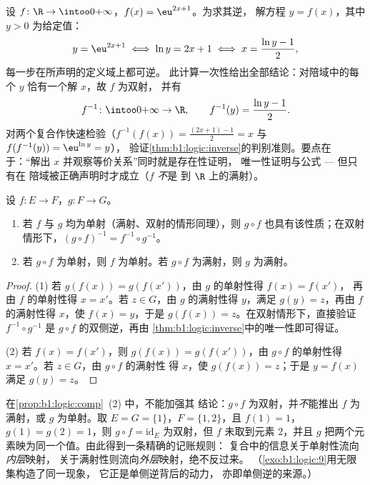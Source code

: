 \begin{example}[实际计算逆映射]\label{ex:b1:logic:inversecomp}
设 $f \colon \R \to \intoo0{+\infty}$，$f(x) = \eu^{2x+1}$。为求其逆，
解方程 $y = f(x)$，其中 $y > 0$ 为给定值：
\[
y = \eu^{2x+1} \iff \ln y = 2x + 1 \iff x = \frac{\ln y - 1}2 ,
\]
每一步在所声明的定义域上都可逆。
此计算一次性给出全部结论：对陪域中的每个 $y$
恰有一个解 $x$，故 $f$ 为双射，
并有
\[
f^{-1} \colon \intoo0{+\infty} \to \R,
\qquad
f^{-1}(y) = \frac{\ln y - 1}2 .
\]
对两个复合作快速检验（$f^{-1}(f(x)) = \frac{(2x+1) -
1}2 = x$ 与 $f(f^{-1}(y)) = \eu^{\ln y} = y$），
验证\cref{thm:b1:logic:inverse}的判别准则。要点在于：“解出
$x$ 并观察等价关系”同时就是存在性证明，
唯一性证明与公式 --- 但只有在
陪域被正确声明时才成立（$f$ \emph{不}是
到 $\R$ 上的满射）。
\end{example}

\begin{proposition}[复合与三种性质]\label{prop:b1:logic:comp}
设 $f \colon E \to F$，$g \colon F \to G$。
\begin{enumerate}
  \item 若 $f$ 与 $g$ 均为单射（满射、双射的情形同理），则
        $g \circ f$ 也具有该性质；在双射情形下，$(g \circ f)^{-1} = f^{-1} \circ
        g^{-1}$。
  \item 若 $g \circ f$ 为单射，则 $f$ 为单射。若
        $g \circ f$ 为满射，则 $g$ 为满射。
\end{enumerate}
\end{proposition}

\begin{proof}
(1) 若 $g(f(x)) = g(f(x'))$，由 $g$ 的单射性得 $f(x) = f(x')$，
再由 $f$ 的单射性得 $x = x'$。若 $z \in G$，由
$g$ 的满射性得 $y$，满足 $g(y) = z$，再由 $f$ 的满射性得 $x$，使
$f(x) = y$，于是 $g(f(x)) = z$。在双射情形下，直接验证
$f^{-1} \circ g^{-1}$ 是 $g \circ f$ 的双侧逆，再由
\cref{thm:b1:logic:inverse}中的唯一性即可得证。

(2) 若 $f(x) = f(x')$，则 $g(f(x)) = g(f(x'))$，由
$g \circ f$ 的单射性得 $x = x'$。若 $z \in G$，由 $g \circ f$ 的满射性
得 $x$，使 $g(f(x)) = z$；于是 $y = f(x)$ 满足 $g(y) = z$。
\end{proof}

\begin{example}[(2) 不可加强]\label{ex:b1:logic:compsharp}
在\cref{prop:b1:logic:comp}~(2) 中，不能加强其
结论：$g \circ f$ 为双射，并\emph{不}能推出 $f$
为满射，或 $g$ 为单射。取 $E = G = \{1\}$，$F = \{1,
2\}$，且 $f(1) = 1$，$g(1) = g(2) = 1$，则 $g \circ f =
\mathrm{id}_E$ 为双射，但 $f$ 未取到元素 $2$，并且
$g$ 把两个元素映为同一个值。由此得到一条精确的记账规则：
复合中的信息关于单射性流向\emph{内层}映射，
关于满射性则流向\emph{外层}映射，绝不反过来。
（\cref{exo:b1:logic:9}用无限集构造了同一现象，
它正是单侧逆背后的动力，
亦即单侧逆的来源。）
\end{example}

